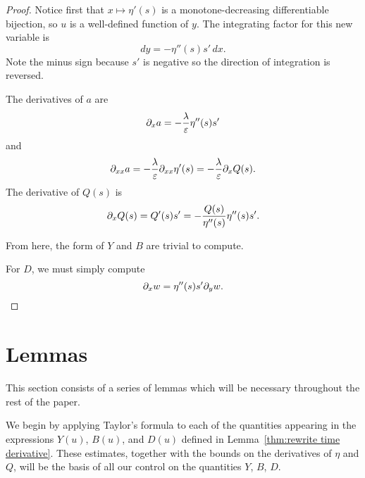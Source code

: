 \begin{proof}
Notice first that $x \mapsto \eta'(s)$ is a monotone-decreasing differentiable bijection, so $u$ is a well-defined function of $y$.  The integrating factor for this new variable is 
\[ dy = -\eta''(s)s' \,dx. \]
Note the minus sign because $s'$ is negative so the direction of integration is reversed.  

The derivatives of $a$ are
\[ \partial_x a = - \frac{\lambda}{\varepsilon} \eta''(s) s' \]
and
\[ \partial_{xx}a = - \frac{\lambda}{\varepsilon} \partial_{xx} \eta'(s) = - \frac{\lambda}{\varepsilon} \partial_x Q(s). \]
The derivative of $Q(s)$ is
\[ \partial_x Q(s) = Q'(s) s' = - \frac{Q(s)}{\eta''(s)} \eta''(s) s'. \]

From here, the form of $Y$ and $B$ are trivial to compute.  

For $D$, we must simply compute
\[ \partial_x w = \eta''(s) s' \partial_y w. \]
\end{proof}


\section{Lemmas} \label{sec:lemmas}
This section consists of a series of lemmas which will be necessary throughout the rest of the paper.  

We begin by applying Taylor's formula to each of the quantities appearing in the expressions $Y(u)$, $B(u)$, and $D(u)$ defined in Lemma~\ref{thm:rewrite time derivative}.  These estimates, together with the bounds on the derivatives of $\eta$ and $Q$, will be the basis of all our control on the quantities $Y$, $B$, $D$.  

